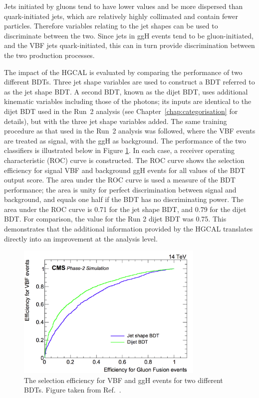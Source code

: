 Jets initiated by gluons tend to have lower \pt values and be more dispersed than quark-initiated jets, 
which are relatively highly collimated and contain fewer particles. 
Therefore variables relating to the jet shapes can be used to discriminate between the two.
Since jets in ggH events tend to be gluon-initiated, 
and the VBF jets quark-initiated, 
this can in turn provide discrimination between the two production processes.

The impact of the HGCAL is evaluated by comparing the performance of two different BDTs.
Three jet shape variables are used to construct a BDT referred to as the jet shape BDT.
A second BDT, known as the dijet BDT, uses additional kinematic variables including those of the photons; 
its inputs are identical to the dijet BDT used in the Run~2 analysis 
(see Chapter~\ref{chap:categorisation} for details), but with the three jet shape variables added.
The same training procedure as that used in the Run~2 analysis was followed, 
where the VBF events are treated as signal, with the ggH as background.
The performance of the two classifiers is illustrated below in Figure \ref{fig:hgcal_VBFvsGGH}.
In each case, a receiver operating characteristic (ROC) curve is constructed.
The ROC curve shows the selection efficiency for signal VBF and background ggH events 
for all values of the BDT output score.
The area under the ROC curve is used a measure of the BDT performance; 
the area is unity for perfect discrimination between signal and background, 
and equals one half if the BDT has no discriminating power.
The area under the ROC curve is 0.71 for the jet shape BDT, and 0.79 for the dijet BDT.
For comparison, the value for the Run 2 dijet BDT was 0.75.
This demonstrates that the additional information provided by the HGCAL translates directly
into an improvement at the analysis level.

\begin{figure}[h!]
  \centering
  \includegraphics[width=0.8\textwidth]{Figures/HGCAL/VBFvsGGH.png}
  \caption[VBF and ggH selection efficiencies for two BDTs.]
  {
    The selection efficiency for VBF and ggH events for two different BDTs. 
    Figure taken from Ref.~\cite{HGCAL}.
  }
  \label{fig:hgcal_VBFvsGGH}
\end{figure}

